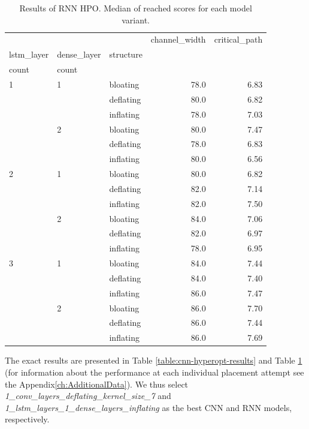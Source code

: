 \begin{table}
	\begin{tabular}{lllrr}
		\toprule
		&   &           &  channel\_width &  critical\_path \\
		lstm\_layer & dense\_layer & structure &                &                   \\
		count & count &  &                &                   \\
		\midrule
		1 & 1 & bloating &           78.0 &              6.83 \\
		&   & deflating &           80.0 &              6.82 \\
		&   & inflating &           78.0 &              7.03 \\
		& 2 & bloating &           80.0 &              7.47 \\
		&   & deflating &           78.0 &              6.83 \\
		&   & inflating &           80.0 &              6.56 \\
		2 & 1 & bloating &           80.0 &              6.82 \\
		&   & deflating &           82.0 &              7.14 \\
		&   & inflating &           82.0 &              7.50 \\
		& 2 & bloating &           84.0 &              7.06 \\
		&   & deflating &           82.0 &              6.97 \\
		&   & inflating &           78.0 &              6.95 \\
		3 & 1 & bloating &           84.0 &              7.44 \\
		&   & deflating &           84.0 &              7.40 \\
		&   & inflating &           86.0 &              7.47 \\
		& 2 & bloating &           86.0 &              7.70 \\
		&   & deflating &           86.0 &              7.44 \\
		&   & inflating &           86.0 &              7.69 \\
		\bottomrule
	\end{tabular}
	\caption{Results of \gls{RNN} HPO. Median of reached scores for each model variant.}
	\label{table:rnn-hyperopt-results}
\end{table}

The exact results are presented in Table \ref{table:cnn-hyperopt-results} and Table \ref{table:rnn-hyperopt-results} (for information about the performance at each individual placement attempt see the Appendix\ref{ch:AdditionalData}). We thus select \textit{1\_conv\_layers\_deflating\_kernel\_size\_7} and \textit{1\_lstm\_layers\_1\_dense\_layers\_inflating} as the best \gls{CNN} and \gls{RNN} models, respectively. 


